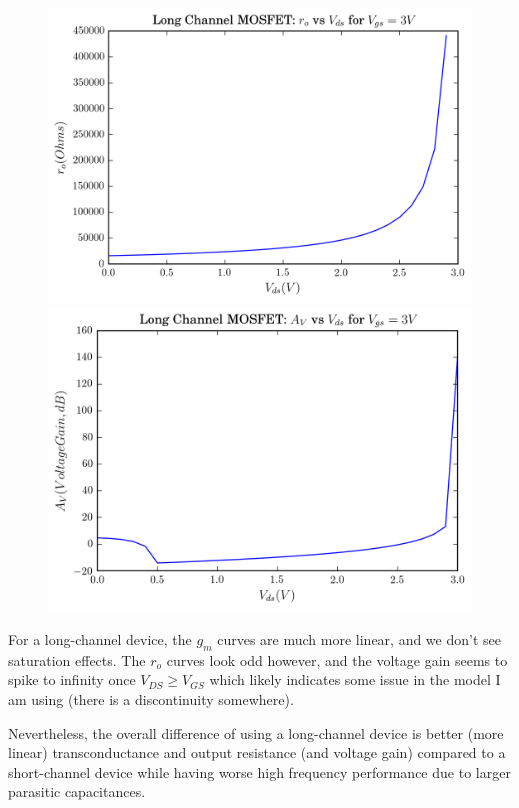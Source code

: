 \documentclass[11pt]{article}
\begin{document}
\begin{figure}[H]
	\includegraphics[width=\linewidth]{images/long_channel_ro_vs_vds.png}
	\endminipage\hfill
	\includegraphics[width=\linewidth]{images/long_channel_av_vs_vds.png}
	\endminipage
\end{figure}

For a long-channel device, the $g_m$ curves are much more linear, and we don't see saturation effects. The $r_o$ curves look odd however, and the voltage gain seems to spike to infinity once $V_{DS} \geq V_{GS}$ which likely indicates some issue in the model I am using (there is a discontinuity somewhere).

Nevertheless, the overall difference of using a long-channel device is better (more linear) transconductance and output resistance (and voltage gain) compared to a short-channel device while having worse high frequency performance due to larger parasitic capacitances.
\end{document}

